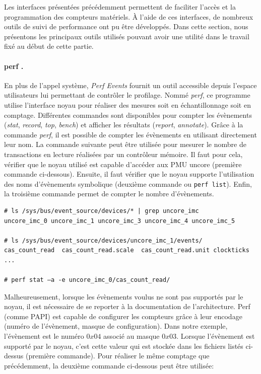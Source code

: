         Les interfaces présentées précédemment permettent de faciliter l'accès et la programmation des compteurs matériels. À l'aide de ces interfaces, de nombreux outils de suivi de performance ont pu être développés. Dans cette section, nous présentons les principaux outils utilisés pouvant avoir une utilité dans le travail fixé au début de cette partie.

        \paragraph{perf \cite{Weaver2013}.} 
            
            En plus de l'appel système, \textit{Perf Events} fournit un outil accessible depuis l'espace utilisateurs lui permettant de contrôler le profilage. Nommé \textit{perf}, ce programme utilise l'interface noyau pour réaliser des mesures soit en échantillonnage soit en comptage. Différentes commandes sont disponibles pour compter les évènements (\textit{stat}, \textit{record}, \textit{top}, \textit{bench}) et afficher les résultats (\textit{report}, \textit{annotate}). Grâce à la commande \textit{perf}, il est possible de compter les évènements en utilisant directement leur nom. La commande suivante peut être utilisée pour mesurer le nombre de transactions en lecture réalisées par un contrôleur mémoire. Il faut pour cela, vérifier que le noyau utilisé est capable d'accéder aux PMU uncore (première commande ci-dessous). Ensuite, il faut vérifier que le noyau supporte l'utilisation des noms d'évènements symbolique (deuxième commande ou \verb|perf list|). Enfin, la troisième commande permet de compter le nombre d'évènements.
            
\begin{verbatim}
# ls /sys/bus/event_source/devices/* | grep uncore_imc
uncore_imc_0 uncore_imc_1 uncore_imc_3 uncore_imc_4 uncore_imc_5

# ls /sys/bus/event_source/devices/uncore_imc_1/events/
cas_count_read  cas_count_read.scale  cas_count_read.unit clockticks ...         

# perf stat –a -e uncore_imc_0/cas_count_read/
\end{verbatim}
            
            Malheureusement, lorsque les évènements voulus ne sont pas supportés par le noyau, il est nécessaire de se reporter à la documentation de l'architecture. Perf (comme PAPI) est capable de configurer les compteurs grâce à leur encodage (numéro de l'évènement, masque de configuration). Dans notre exemple, l'évènement est le numéro $0x04$ associé au masque $0x03$. Lorsque l'évènement est supporté par le noyau, c'est cette valeur qui est stockée dans les fichiers listés ci-dessus (première commande). Pour réaliser le même comptage que précédemment, la deuxième commande ci-dessous peut être utilisée:

